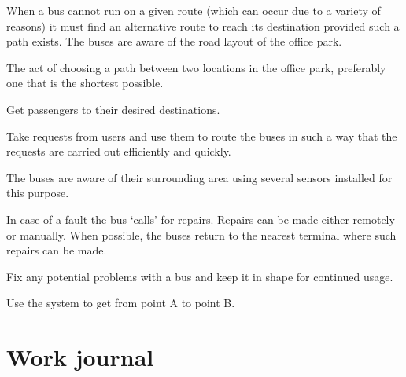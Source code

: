 \documentclass[a4paper]{article}
\begin{document}
\begin{description}[style=nextline]
	\item[Find alternative \gls{route}]
		When a bus cannot run on a given \gls{route} (which can occur
		due to a variety of reasons) it must find an alternative
		\gls{route} to reach its destination provided such a path
		exists. The buses are aware of the road layout of the office
		park.

	\item[Select \gls{route}]
		The act of choosing a path between two locations in the office
		park, preferably one that is the shortest possible.

	\item[Transport passengers]
		Get passengers to their desired destinations.

	\item[Manage \gls{request}s]
		Take \gls{request}s from users and use them to \gls{route} the
		buses in such a way that the \gls{request}s are carried out
		efficiently and quickly.

	\item[Monitor environment]
		The buses are aware of their surrounding area using several
		\gls{sensor}s installed for this purpose.

	\item[Notify mechanics]
		In case of a fault the bus ‘calls’ for repairs. Repairs can be
		made either remotely or manually. When possible, the buses
		return to the nearest \gls{terminal} where such repairs can be
		made.

	\item[Repair and maintain]
		Fix any potential problems with a bus and keep it in shape for
		continued usage.

	\item[Travel]
		Use the system to get from point A to point B.
\end{description}


\section{Work journal}


\clearpage
\printglossaries
\end{document}
